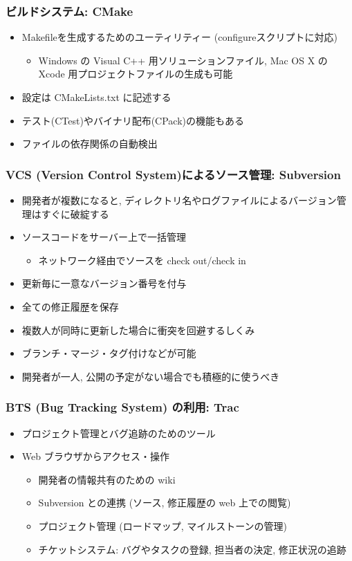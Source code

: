 \begin{frame}
  \frametitle{ビルドシステム: CMake}
  \begin{itemize}
    \setlength{\itemsep}{1em}
  \item Makefileを生成するためのユーティリティー (configureスクリプトに対応)
    \begin{itemize}
    \item Windows の Visual C++ 用ソリューションファイル, Mac OS X の Xcode 用プロジェクトファイルの生成も可能
    \end{itemize}
  \item 設定は CMakeLists.txt に記述する
  \item テスト(CTest)やバイナリ配布(CPack)の機能もある
  \item ファイルの依存関係の自動検出
  \end{itemize}
\end{frame}

\begin{frame}
  \frametitle{VCS (Version Control System)によるソース管理: Subversion}
  \begin{itemize}
  \item 開発者が複数になると, ディレクトリ名やログファイルによるバージョン管理はすぐに破綻する
  \item ソースコードをサーバー上で一括管理
    \begin{itemize}
    \item ネットワーク経由でソースを check out/check in
    \end{itemize}
  \item 更新毎に一意なバージョン番号を付与
  \item 全ての修正履歴を保存
  \item 複数人が同時に更新した場合に衝突を回避するしくみ
  \item ブランチ・マージ・タグ付けなどが可能
  \item 開発者が一人, 公開の予定がない場合でも積極的に使うべき
  \end{itemize}
\end{frame}

\begin{frame}
  \frametitle{BTS (Bug Tracking System) の利用: Trac}
  \begin{itemize}
    \setlength{\itemsep}{1em}
  \item プロジェクト管理とバグ追跡のためのツール
  \item Web ブラウザからアクセス・操作
    \begin{itemize}
    \item 開発者の情報共有のための wiki
    \item Subversion との連携 (ソース, 修正履歴の web 上での閲覧)
    \item プロジェクト管理 (ロードマップ, マイルストーンの管理)
    \item チケットシステム: バグやタスクの登録, 担当者の決定, 修正状況の追跡
    \end{itemize}
  \end{itemize}
\end{frame}

